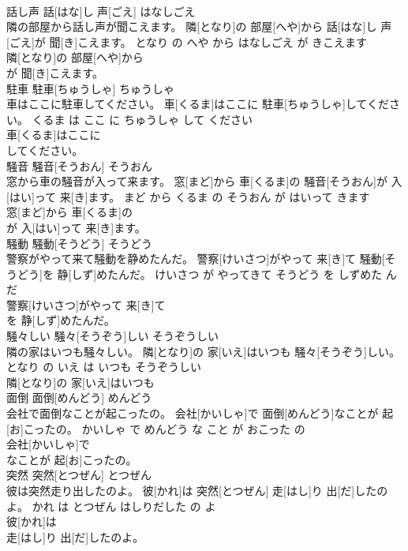 \documentclass[8pt]{extreport}
\begin{document}
\begin{CJK}{UTF8}{min}
\\	話し声	話[はな]し 声[ごえ]	はなしごえ	
\\	隣の部屋から話し声が聞こえます。	隣[となり]の 部屋[へや]から 話[はな]し 声[ごえ]が 聞[き]こえます。	となり の へや から はなしごえ が きこえます	
\\	隣[となり]の 部屋[へや]から
\\	が 聞[き]こえます。			
\\	駐車	駐車[ちゅうしゃ]	ちゅうしゃ	
\\	車はここに駐車してください。	車[くるま]はここに 駐車[ちゅうしゃ]してください。	くるま は ここ に ちゅうしゃ して ください	
\\	車[くるま]はここに
\\	してください。			
\\	騒音	騒音[そうおん]	そうおん	
\\	窓から車の騒音が入って来ます。	窓[まど]から 車[くるま]の 騒音[そうおん]が 入[はい]って 来[き]ます。	まど から くるま の そうおん が はいって きます	
\\	窓[まど]から 車[くるま]の
\\	が 入[はい]って 来[き]ます。			
\\	騒動	騒動[そうどう]	そうどう	
\\	警察がやって来て騒動を静めたんだ。	警察[けいさつ]がやって 来[き]て 騒動[そうどう]を 静[しず]めたんだ。	けいさつ が やってきて そうどう を しずめた ん だ	
\\	警察[けいさつ]がやって 来[き]て
\\	を 静[しず]めたんだ。			
\\	騒々しい	騒々[そうぞう]しい	そうぞうしい	
\\	隣の家はいつも騒々しい。	隣[となり]の 家[いえ]はいつも 騒々[そうぞう]しい。	となり の いえ は いつも そうぞうしい	
\\	隣[となり]の 家[いえ]はいつも
\\	面倒	面倒[めんどう]	めんどう	
\\	会社で面倒なことが起こったの。	会社[かいしゃ]で 面倒[めんどう]なことが 起[お]こったの。	かいしゃ で めんどう な こと が おこった の	
\\	会社[かいしゃ]で
\\	なことが 起[お]こったの。			
\\	突然	突然[とつぜん]	とつぜん	
\\	彼は突然走り出したのよ。	彼[かれ]は 突然[とつぜん] 走[はし]り 出[だ]したのよ。	かれ は とつぜん はしりだした の よ	
\\	彼[かれ]は
\\	走[はし]り 出[だ]したのよ。			

\end{CJK}
\end{document}
